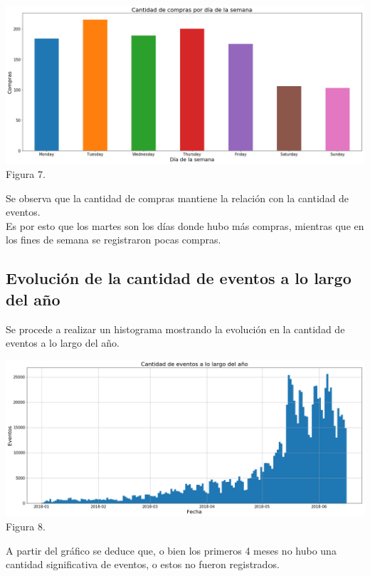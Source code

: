 \documentclass[a4paper ,12pt]{article}
\begin{document}
\begin{center}
	\includegraphics[width=1.1\linewidth]{output_31_1}
	Figura 7.
	
\end{center}

Se observa que la cantidad de compras mantiene la relación con la cantidad de eventos. \\

Es por esto que los martes son los días donde hubo más compras, mientras que en los fines de semana se registraron pocas compras.\\

\newpage
\subsection{Evolución de la cantidad de eventos a lo largo del año}	
Se procede a realizar un histograma mostrando la evolución en la cantidad de eventos a lo largo del año.

\begin{center}
	\includegraphics[width=1.1\linewidth]{output_34_1}
	Figura 8.
	
\end{center}

A partir del gráfico se deduce que, o bien los primeros 4 meses no hubo una cantidad significativa de eventos, o estos no fueron registrados.\\
\end{document}
